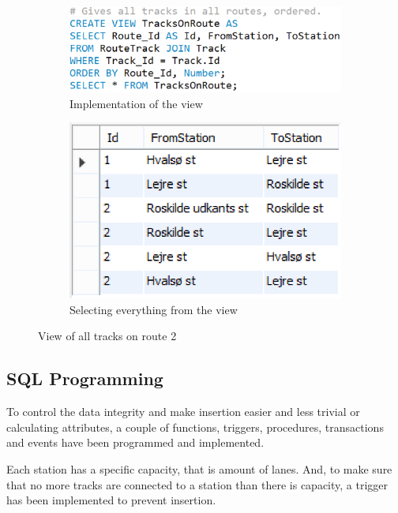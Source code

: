 \begin{figure}[h]
    \centering
    \begin{subfigure}[b]{0.45 \textwidth}
        \centering
        \includegraphics[width=\textwidth]{img/TracksOnRoute}
        \caption{Implementation of the view}
    \end{subfigure}
    \begin{subfigure}[b]{0.45 \textwidth}
        \centering
        \includegraphics{img/RouteView}
        \caption{Selecting everything from the view}
    \end{subfigure}
    \caption{View of all tracks on route 2}
    \label{fig:route}
\end{figure}

\subsection{SQL Programming} \label{sec:sql:programming}
To control the data integrity and make insertion easier and less trivial or 
calculating attributes, a couple of functions, triggers, procedures, 
transactions and events have been programmed and implemented.

Each station has a specific capacity, that is amount of lanes. And, to make 
sure that no more tracks are connected to a station than there is capacity, a 
trigger has been implemented to prevent insertion.

